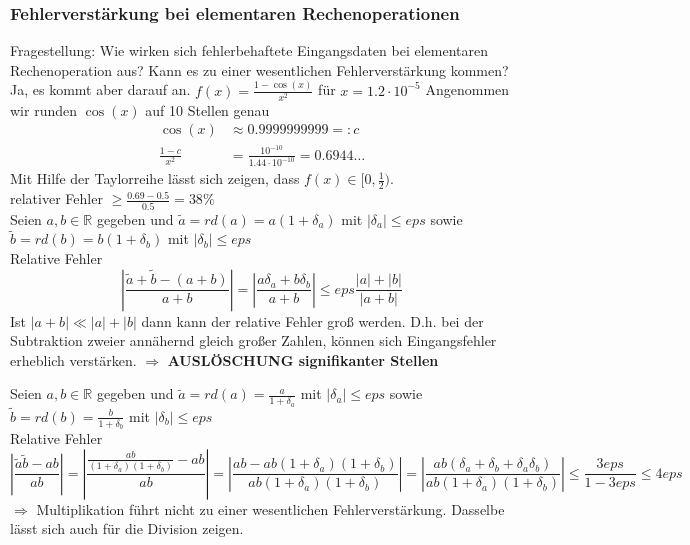 \subsubsection{Fehlerverstärkung bei elementaren Rechenoperationen}
Fragestellung: Wie wirken sich fehlerbehaftete Eingangsdaten bei elementaren
Rechenoperation aus? Kann es zu einer wesentlichen Fehlerverstärkung kommen?
Ja, es kommt aber darauf an.
$ f(x)=\frac{1 - \cos(x)}{x^2} $ für $x=1.2 \cdot 10^{-5} $
Angenommen wir runden $\cos(x)$ auf 10 Stellen genau \\
\begin{align*}
 \cos(x) &\approx 0.999 999 999 9 =: c \\
 \frac{1 - c}{x^2} &= \frac{10^{-10}}{1.44 \cdot 10^{-10}} = 0.6944\dots 
\end{align*}
Mit Hilfe der Taylorreihe lässt sich zeigen, dass $ f(x) \in [0, \frac{1}{2}) $. \\
relativer Fehler $ \geq \frac{0.69 - 0.5}{0.5} = 38\% $ \\

Seien $ a, b \in \mathbb{R} $ gegeben und
$ \tilde{a} = rd(a) = a (1 + \delta_{a}) $ mit $ | \delta_{a} | \leq eps $ sowie
$ \tilde{b} = rd(b) = b (1 + \delta_{b}) $ mit $ | \delta_{b} | \leq eps $ \\
Relative Fehler\\
\begin{equation*}
\left| \frac{\tilde{a} + \tilde{b} - (a + b)}{a + b} \right| =
\left| \frac{a\delta_{a} + b\delta_{b}}{a + b} \right| \leq eps \frac{|a| + |b|}{|a + b|} 
\end{equation*}
Ist $ |a + b| \ll |a| + |b| $ dann kann der relative Fehler groß werden.
D.h. bei der Subtraktion zweier annähernd gleich großer Zahlen, können
sich Eingangsfehler erheblich verstärken. $\Rightarrow$ \large{\textcolor{rot}{\textbf{AUSLÖSCHUNG
signifikanter Stellen}}}

Seien $ a, b \in \mathbb{R} $ gegeben und
$ \tilde{a} = rd(a) = \frac{a}{1 + \delta_{a}} $ mit $ | \delta_{a} | \leq eps $ sowie
$ \tilde{b} = rd(b) = \frac{b}{1 + \delta_{b}} $ mit $ | \delta_{b} | \leq eps $ \\
Relative Fehler
\begin{equation*}
\left| \frac{\tilde{a}\tilde{b} - a b}{a b} \right| =
\left| \frac{\frac{ab}{(1 + \delta_{a})(1 + \delta_{b})} - ab}{ab}\right| =
\left| \frac{ab - ab(1 + \delta_{a})(1 + \delta_{b})}{ab(1 + \delta_{a})(1 + \delta_{b})} \right| =
\left| \frac{ab(\delta_{a} + \delta_{b} + \delta_{a}\delta_{b})}{ab(1 + \delta_{a})(1 + \delta_{b})} \right| \leq
\frac{3eps}{1 - 3eps} \leq 4eps 
\end{equation*}
$\Rightarrow$ Multiplikation führt nicht zu einer wesentlichen Fehlerverstärkung.
Dasselbe lässt sich auch für die Division zeigen.

